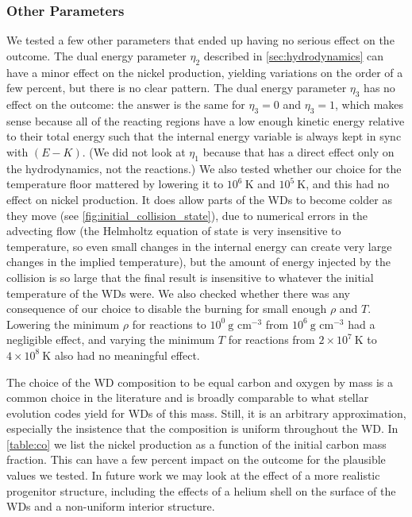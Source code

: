 \documentclass[12pt]{article}
\begin{document}
\subsubsection{Other Parameters}
\label{sec:collision_parameters:other}

We tested a few other parameters that ended up having no serious effect on the outcome.
The dual energy parameter $\eta_2$ described in \autoref{sec:hydrodynamics} can have a
minor effect on the nickel production, yielding variations on the order of a few percent,
but there is no clear pattern. The dual energy parameter $\eta_3$ has no effect on the
outcome: the answer is the same for $\eta_3 = 0$ and $\eta_3 = 1$, which makes sense
because all of the reacting regions have a low enough kinetic energy relative to their
total energy such that the internal energy variable is always kept in sync with $(E - K)$.
(We did not look at $\eta_1$ because that has a direct effect only on the hydrodynamics,
not the reactions.) We also tested whether our choice for the temperature floor mattered
by lowering it to $10^6\ \text{K}$ and $10^5\ \text{K}$, and this had no effect on nickel
production. It does allow parts of the WDs to become colder as they move (see
\autoref{fig:initial_collision_state}), due to numerical
errors in the advecting flow (the Helmholtz equation of state is very insensitive to
temperature, so even small changes in the internal energy can create very large changes
in the implied temperature), but the amount of energy injected by the collision is so
large that the final result is insensitive to whatever the initial temperature of the
WDs were. We also checked whether there was any consequence of our choice to disable the
burning for small enough $\rho$ and $T$. Lowering the minimum $\rho$ for reactions to
$10^0\ \text{g cm}^{-3}$ from $10^6\ \text{g cm}^{-3}$ had a negligible effect,
and varying the minimum $T$ for reactions from $2 \times 10^{7}\ \text{K}$ to
$4 \times 10^{8}\ \text{K}$ also had no meaningful effect.

The choice of the WD composition to be equal carbon and oxygen by mass is a common
choice in the literature and is broadly comparable to what stellar evolution codes
yield for WDs of this mass. Still, it is an arbitrary approximation, especially the
insistence that the composition is uniform throughout the WD. In \autoref{table:co}
we list the nickel production as a function of the initial carbon mass fraction.
This can have a few percent impact on the outcome for the plausible values we tested.
In future work we may look at the effect of a more realistic progenitor structure,
including the effects of a helium shell on the surface of the WDs \citep{holcomb:2015}
and a non-uniform interior structure.
\end{document}

